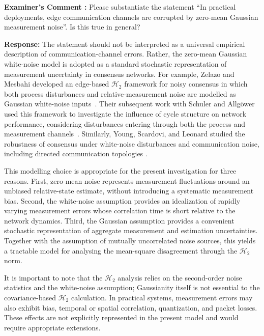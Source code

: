\documentclass[11pt,a4paper]{article}
\newcounter{examcomment}
\renewcommand{\theexamcomment}{\arabic{examcomment}}
\newcommand{\comment}[1]{%
	\refstepcounter{examcomment}%
	\par\vspace{5pt}\noindent
	\colorbox{gray!13}{%
		\parbox{\dimexpr\linewidth-2\fboxsep}{%
			\textbf{Examiner's Comment \theexamcomment:} #1%
		}%
	}%
	\par
}
\newcommand{\response}{\par\textbf{Response:} }
\newcommand{\revision}{\par\textbf{Proposed thesis revision:} }
\begin{document}

\comment{Please substantiate the statement ``In practical deployments, edge communication channels are corrupted by zero-mean Gaussian measurement noise''. Is this true in general?}
\response
The statement should not be interpreted as a universal empirical description of communication-channel errors. Rather, the
zero-mean Gaussian white-noise model is adopted as a standard stochastic representation of measurement uncertainty in consensus networks. For example, Zelazo and Mesbahi developed an edge-based $\mathcal{H}_2$ framework for noisy consensus in which both process disturbances and relative-measurement noise are modelled as Gaussian white-noise inputs~\cite{zelazo2009h2}. Their subsequent work with Schuler and Allgöwer used this framework to investigate the influence of cycle structure on network performance, considering disturbances entering through both the process and measurement channels~\cite{zelazo2013performance}. Similarly, Young, Scardovi, and Leonard studied the robustness
of consensus under white-noise disturbances and communication noise, including directed communication topologies
\cite{young2010robustness}.

This modelling choice is appropriate for the present investigation for three reasons. First, zero-mean noise represents measurement fluctuations around an unbiased relative-state estimate, without introducing a systematic measurement bias. Second, the white-noise assumption provides an idealization of rapidly varying measurement errors whose correlation time is short relative to the network dynamics. Third, the Gaussian assumption provides a convenient stochastic representation of aggregate measurement and estimation uncertainties. Together with the assumption of mutually uncorrelated noise sources, this yields a tractable model for analysing the mean-square disagreement through the $\mathcal{H}_2$ norm.

It is important to note that the $\mathcal{H}_2$ analysis relies on the second-order noise statistics and the white-noise assumption; Gaussianity itself is not essential to the covariance-based $\mathcal{H}_2$ calculation. In practical systems, measurement errors may also exhibit bias, temporal or spatial correlation, quantization, and packet losses. These effects are not explicitly represented in the present model and would require appropriate extensions.
\end{document}

